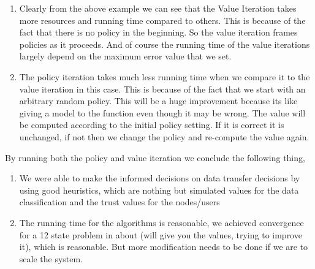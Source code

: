 \begin{enumerate}
    \item Clearly from the above example we can see that the Value Iteration takes
more resources and running time compared to others. This is because of the fact
that there is no policy in the beginning. So the value iteration frames policies
as it proceeds. And of course the running time of the value iterations largely
depend on the maximum error value that we set.
    \item The policy iteration takes much less running time when we compare it to the
value iteration in this case. This is because of the fact that we start with an
arbitrary random policy. This will be a huge improvement because its like giving
a model to the function even though it may be wrong. The value will be computed
according to the initial policy setting. If it is correct it is unchanged, if
not then we change the policy and re-compute the value again.
\end{enumerate}
By running both the policy and value iteration we conclude the following thing,
\begin{enumerate}
    \item We were able to make the informed decisions on data transfer decisions by
using good heuristics, which are nothing but simulated values for the data
classification and the trust values for the nodes/users
    \item The running time for
the algorithms is reasonable, we achieved convergence for a 12 state problem in
about (will give you the values, trying to improve it), which is reasonable. But
more modification needs to be done if we are to scale the system.
\end{enumerate}
